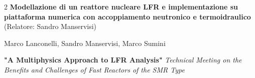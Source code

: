 \documentclass[10pt,a4paper,ragged2e,withhyper]{altacv}
\begin{document}
\begin{paracol}{2}
\textbf{Modellazione di un reattore nucleare LFR e implementazione su piattaforma numerica con accoppiamento neutronico e termoidraulico} (Relatore: Sandro Manservisi)


\divider




Marco Lanconelli, Sandro Manservisi, Marco Sumini 

\textbf{"A Multiphysics Approach to LFR Analysis"} \textit{Technical Meeting on the Benefits and Challenges of Fast Reactors of the SMR Type}



\newpage



\switchcolumn




\end{paracol}
\end{document}
